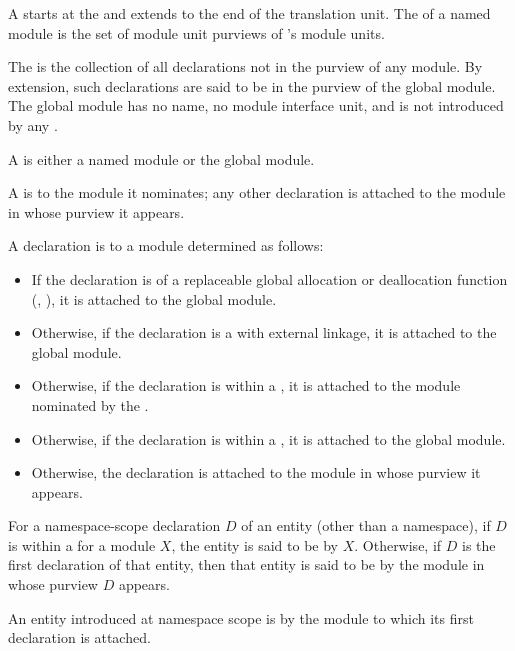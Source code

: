 \begin{std.txt}
\alinea
A  starts at the 
and extends to the end of the translation unit.
The  of a named module  is the set of module unit purviews
of 's module units. 

\alinea
The  is the collection of all declarations
not in the purview of any module.   By
extension, such declarations  are said to be in the purview of the
global module. 
\enternote
The global module has no name, no module interface unit, and is not
introduced by any .
\exitnote

\alinea
  A  is either a named module or the global module.
  \begin{before}\color{addclr}
  A  is
   to the module it nominates; any other declaration
  is attached to the module in whose purview it appears.
  \end{before}
  \begin{after}\color{addclr}
  A declaration is  to a module determined as follows:
  \begin{itemize}\color{addclr}
  \item If the declaration is of a replaceable global allocation or deallocation
  function (, ),
  it is attached to the global module.

  \item Otherwise, if the declaration is a
   with external linkage, it
  is attached to the global module.
  
  \item Otherwise, if the declaration is
  within a , it
  is attached to the module nominated by the
  .

  \item Otherwise, if the declaration is
  within a , it
  is attached to the global module.

  \item Otherwise, the declaration is
  attached to the module in whose purview it appears.
  \end{itemize}
  \end{after}

  \alinea
  \begin{before}\color{addclr}
For a namespace-scope declaration $D$ of an entity (other than a
namespace), if $D$ is within a 
for a module $X$, the entity is said to be  by $X$.
Otherwise, if $D$ is the first declaration of that entity, then that entity is said
to be  by the module in whose purview $D$ appears. 
\end{before}
\begin{after}\color{addclr}
An entity introduced at namespace scope is  by the
module to which its first declaration is attached.
\end{after}


\end{std.txt}
